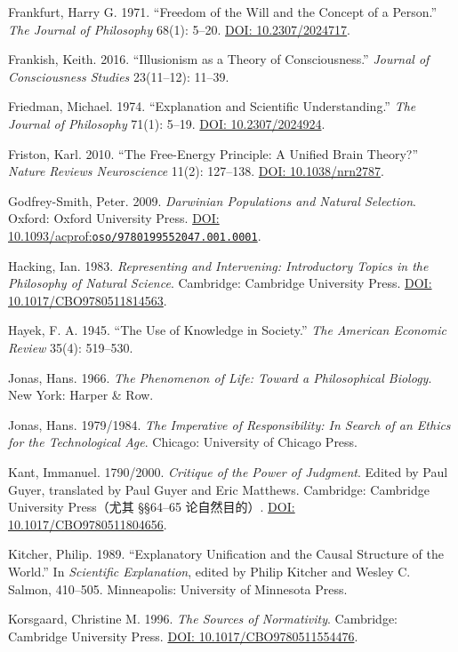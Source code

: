 \documentclass[
  11pt,
  oneside]{book}
\begin{document}
Frankfurt, Harry G. 1971. ``Freedom of the Will and the Concept of a Person.'' \emph{The Journal of Philosophy} 68(1): 5--20. \href{https://doi.org/10.2307/2024717}{DOI: 10.2307/2024717}.

Frankish, Keith. 2016. ``Illusionism as a Theory of Consciousness.'' \emph{Journal of Consciousness Studies} 23(11--12): 11--39.

Friedman, Michael. 1974. ``Explanation and Scientific Understanding.'' \emph{The Journal of Philosophy} 71(1): 5--19. \href{https://doi.org/10.2307/2024924}{DOI: 10.2307/2024924}.

Friston, Karl. 2010. ``The Free-Energy Principle: A Unified Brain Theory?'' \emph{Nature Reviews Neuroscience} 11(2): 127--138. \href{https://doi.org/10.1038/nrn2787}{DOI: 10.1038/nrn2787}.

Godfrey-Smith, Peter. 2009. \emph{Darwinian Populations and Natural Selection}. Oxford: Oxford University Press. \href{https://doi.org/10.1093/acprof:oso/9780199552047.001.0001}{DOI: 10.1093/acprof:\nolinkurl{oso/9780199552047.001.0001}}.

Hacking, Ian. 1983. \emph{Representing and Intervening: Introductory Topics in the Philosophy of Natural Science}. Cambridge: Cambridge University Press. \href{https://doi.org/10.1017/CBO9780511814563}{DOI: 10.1017/CBO9780511814563}.

Hayek, F. A. 1945. ``The Use of Knowledge in Society.'' \emph{The American Economic Review} 35(4): 519--530.

Jonas, Hans. 1966. \emph{The Phenomenon of Life: Toward a Philosophical Biology}. New York: Harper \& Row.

Jonas, Hans. 1979/1984. \emph{The Imperative of Responsibility: In Search of an Ethics for the Technological Age}. Chicago: University of Chicago Press.

Kant, Immanuel. 1790/2000. \emph{Critique of the Power of Judgment}. Edited by Paul Guyer, translated by Paul Guyer and Eric Matthews. Cambridge: Cambridge University Press（尤其 §§64--65 论自然目的）. \href{https://doi.org/10.1017/CBO9780511804656}{DOI: 10.1017/CBO9780511804656}.

Kitcher, Philip. 1989. ``Explanatory Unification and the Causal Structure of the World.'' In \emph{Scientific Explanation}, edited by Philip Kitcher and Wesley C. Salmon, 410--505. Minneapolis: University of Minnesota Press.

Korsgaard, Christine M. 1996. \emph{The Sources of Normativity}. Cambridge: Cambridge University Press. \href{https://doi.org/10.1017/CBO9780511554476}{DOI: 10.1017/CBO9780511554476}.
\end{document}
